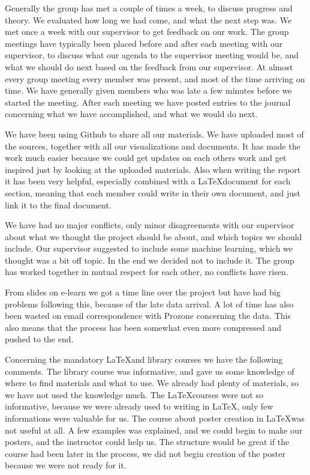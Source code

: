 \documentclass[Report.tex]{subfiles}
\begin{document}
Generally the group has met a couple of times a week, to discuss progress and theory. We evaluated how long we had come, and what the next step was. We met once a week with our supervisor to get feedback on our work. The group meetings have typically been placed before and after each meeting with our supervisor, to discuss what our agenda to the supervisor meeting would be, and what we should do next based on the feedback from our supervisor. At almost every group meeting every member was present, and most of the time arriving on time. We have generally given members who was late a few minutes before we started the meeting. After each meeting we have posted entries to the journal concerning what we have accomplished, and what we would do next.

We have been using Github to share all our materials. We have uploaded most of the sources, together with all our visualizations and documents. It has made the work much easier because we could get updates on each others work and get inspired just by looking at the uploaded materials. Also when writing the report it has been very helpful, especially combined with a \LaTeX \space document for each section, meaning that each member could write in their own document, and just link it to the final document.

We have had no major conflicts, only minor disagreements with our supervisor about what we thought the project should be about, and which topics we should include. Our supervisor suggested to include some machine learning, which we thought was a bit off topic. In the end we decided not to include it. The group has worked together in mutual respect for each other, no conflicts have risen.

From slides on e-learn we got a time line over the project but have had big problems following this, because of the late data arrival. A lot of time has also been wasted on email correspondence with Prozone concerning the data. This also means that the process has been somewhat even more compressed and pushed to the end. 

Concerning the mandatory \LaTeX\space and library courses we have the following comments. The library course was informative, and gave us some knowledge of where to find materials and what to use. We already had plenty of materials, so we have not used the knowledge much. The \LaTeX \space courses were not so informative, because we were already used to writing in \LaTeX, only few informations were valuable for us. The course about poster creation in \LaTeX\space was not useful at all. A few examples was explained, and we could begin to make our posters, and the instructor could help us. The structure would be great if the course had been later in the process, we did not begin creation of the poster because we were not ready for it.
\end{document}
